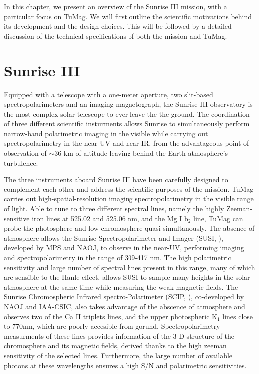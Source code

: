 In this chapter, we present an overview of the Sunrise III mission, with a particular focus on TuMag. We will first outline the scientific motivations behind its development and the design choices. This will be followed by a detailed discussion of the technical specifications of both the mission and TuMag.

\section{Sunrise III}

Equipped with a telescope with a one-meter aperture, two slit-based spectropolarimeters and an imaging magnetograph, the Sunrise III observatory is the most complex solar telescope to ever leave the the ground. The coordination of three different scientific insturments allows Sunrise to simultaneously perform narrow-band polarimetric imaging in the visible while carrying out spectropolarimetry in the near-UV and near-IR, from the advantageous point of observation of $\sim$36 km of altitude leaving behind the Earth atmosphere's turbulence. 

The three instruments aboard Sunrise III have been carefully designed to complement each other and address the scientific purposes of the mission. TuMag \citep{tumag} carries out high-spatial-resolution imaging spectropolarimetry in the visible range of light. Able to tune to three different spectral lines, namely the highly Zeeman-sensitive iron lines at 525.02 and 525.06 nm, and the Mg I b$_2$ line, TuMag can probe the photosphere and low chromosphere quasi-simultanously. The absence of atmosphere allows the Sunrise Spectropolarimeter and Imager (SUSI, \citealt{susi}), developed by MPS and NAOJ, to observe in the near-UV, performing imaging and spectropolarimetry in the range of 309-417 nm. The high polarimetric sensitivity and large number of spectral lines present in this range, many of which are sensible to the Hanle effect, allows SUSI to sample many heights in the solar atmosphere at the same time while measuring the weak magnetic fields. The Sunrise Chromospheric Infrared spectro-Polarimeter (SCIP, \citealt{SCIP}), co-developed by NAOJ and IAA-CSIC, also takes advantage of the abscence of atmosphere and observes two of the Ca II triplets lines, and the upper photospheric K$_{1}$ lines close to 770nm, which are poorly accesible from gorund. Spectropolarimetry measurments of these lines provides information of the 3-D structure of the chromosphere and its magnetic fields, derived thanks to the high zeeman sensitivity of the selected lines. Furthermore, the large number of available photons at these wavelengths ensures a high S/N and polarimetric sensitivities. 

